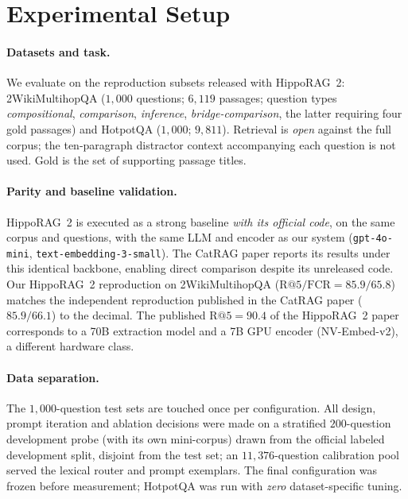 \documentclass[11pt,a4paper]{article}
\newcommand{\hippo}{HippoRAG~2}
\begin{document}
\section{Experimental Setup}
\label{sec:setup}

\paragraph{Datasets and task.} We evaluate on the reproduction subsets
released with \hippo{}: 2WikiMultihopQA ($1{,}000$ questions; $6{,}119$
passages; question types \emph{compositional}, \emph{comparison},
\emph{inference}, \emph{bridge-comparison}, the latter requiring four gold
passages) and HotpotQA ($1{,}000$; $9{,}811$). Retrieval is \emph{open}
against the full corpus; the ten-paragraph distractor context accompanying
each question is not used. Gold is the set of supporting passage titles.

\paragraph{Parity and baseline validation.} \hippo{} is executed as a strong
baseline \emph{with its official code}, on the same corpus and questions,
with the same LLM and encoder as our system
(\texttt{gpt-4o-mini}, \texttt{text-embedding-3-small}). The CatRAG paper
reports its results under this identical backbone, enabling direct
comparison despite its unreleased code. Our \hippo{} reproduction on
2WikiMultihopQA ($\mathrm{R@}5/\mathrm{FCR}=85.9/65.8$) matches the
independent reproduction published in the CatRAG paper ($85.9/66.1$) to the
decimal. The published $\mathrm{R@}5=90.4$ of the \hippo{} paper corresponds
to a 70B extraction model and a 7B GPU encoder (NV-Embed-v2), a different
hardware class.

\paragraph{Data separation.} The $1{,}000$-question test sets are touched
once per configuration. All design, prompt iteration and ablation decisions
were made on a stratified $200$-question development probe (with its own
mini-corpus) drawn from the official labeled development split, disjoint from
the test set; an $11{,}376$-question calibration pool served the lexical
router and prompt exemplars. The final configuration was frozen before
measurement; HotpotQA was run with \emph{zero} dataset-specific tuning.
\end{document}
